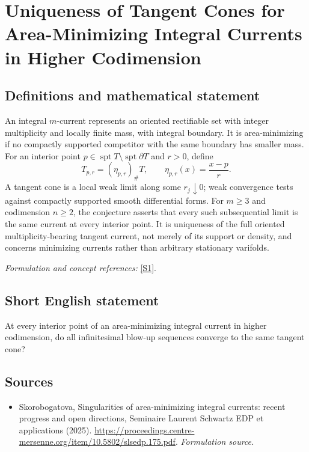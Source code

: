 \documentclass[11pt]{article}
\begin{document}
\section*{\texorpdfstring{Uniqueness of Tangent Cones for Area-Minimizing Integral Currents in Higher Codimension}{Uniqueness of Tangent Cones for Area-Minimizing Integral Currents in Higher Codimension}}\label{418}
\subsection{Definitions and mathematical statement}
An integral $m$-current represents an oriented rectifiable set with integer multiplicity and locally finite mass, with integral boundary. It is area-minimizing if no compactly supported competitor with the same boundary has smaller mass. For an interior point $p\in\operatorname{spt}T\setminus\operatorname{spt}\partial T$ and $r>0$, define
\[
 T_{p,r}=(\eta_{p,r})_\#T,
 \qquad\eta_{p,r}(x)=\frac{x-p}{r}.
\]
A tangent cone is a local weak limit along some $r_j\downarrow0$; weak convergence tests against compactly supported smooth differential forms. For $m\ge3$ and codimension $n\ge2$, the conjecture asserts that every such subsequential limit is the same current at every interior point. It is uniqueness of the full oriented multiplicity-bearing tangent current, not merely of its support or density, and concerns minimizing currents rather than arbitrary stationary varifolds.
\par\smallskip\textit{Formulation and concept references:} \href{https://proceedings.centre-mersenne.org/item/10.5802/slsedp.175.pdf}{[S1]}.

\subsection{Short English statement}
At every interior point of an area-minimizing integral current in higher codimension, do all infinitesimal blow-up sequences converge to the same tangent cone?
\subsection{Sources}
\begin{itemize}
\item[S1]Skorobogatova, Singularities of area-minimizing integral currents: recent progress and open directions, Seminaire Laurent Schwartz EDP et applications (2025).
\url{https://proceedings.centre-mersenne.org/item/10.5802/slsedp.175.pdf}.
\textit{Formulation source.}
\end{itemize}
\end{document}
